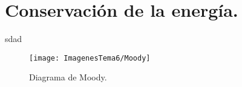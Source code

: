 \chapter{Conservación de la energía.}
sdad
\begin{figure}[H]
	\centering
	\texttt{[image: ImagenesTema6/Moody]}
	\caption{Diagrama de Moody.}
	\label{fig:moody}
\end{figure}
